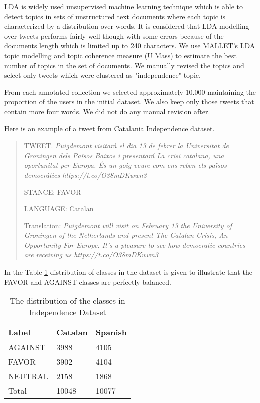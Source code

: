 \documentclass[10pt, a4paper]{article}
\begin{document}
LDA is widely used unsupervised machine learning technique which is able to detect topics in sets of unstructured text documents where each topic is characterized by a distribution over words. It is considered that LDA modelling over tweets performs fairly well though with some errors because of the documents length which is limited up to 240 characters. We use MALLET's LDA \cite{McCallumMALLET} topic modelling and topic coherence measure (U Mass) to estimate the best number of topics in the set of documents. We manually revised the topics and select only tweets which were clustered  as "independence" topic. 

From each annotated collection we selected approximately 10.000 maintaining the proportion of the users in the initial dataset. We also keep only those tweets that contain more four words. We did not do any manual revision after.


Here is an example of a tweet from Catalania Independence dataset. 

\begin{quote}
TWEET. \textit{Puigdemont visitar\`a el dia 13 de febrer la Universitat de Groningen dels Pa\"isos Baixos i presentar\'a  La crisi catalana, una oportunitat per Europa. \'Es un goig veure com ens reben els pa\"isos democr\`atics https://t.co/O38mDKwwn3} 

STANCE: FAVOR 

LANGUAGE: Catalan

Translation: \textit{Puigdemont will visit
on February 13 the University of Groningen of the Netherlands and present The Catalan Crisis, An Opportunity For Europe.
It's a pleasure to see how democratic countries are receiving us https://t.co/O38mDKwwn3}
\end{quote}

In the Table \ref{tab:distr_dataset} distribution of classes in the dataset is given to illustrate that the FAVOR and AGAINST classes are perfectly balanced. 


\begin{table}[!h]
\begin{center}
\begin{tabularx}{\columnwidth}{|l|l|X|}

      \hline
        Label&Catalan&Spanish\\
      \hline
        AGAINST & 3988&4105\\
      \hline
        FAVOR & 3902&4104\\
      \hline
        NEUTRAL & 2158&1868\\
      \hline
        Total & 10048&10077\\
      \hline

\end{tabularx}
\caption{The distribution of the classes in Independence Dataset}
 \end{center}
 \label{tab:distr_dataset}
\end{table}
\end{document}
